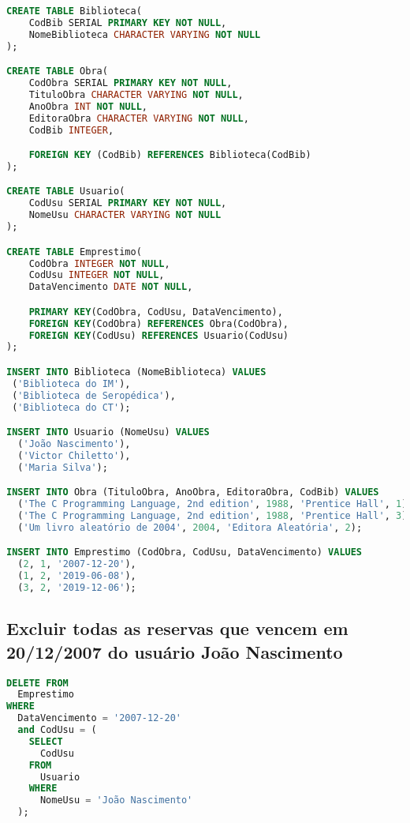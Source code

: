 \documentclass[12pt]{article}
\begin{document}
    \begin{lstlisting}[caption=Scripts em SQL para geração do banco de dados, label={lst:seedsql}, language=SQL]
CREATE TABLE Biblioteca(
    CodBib SERIAL PRIMARY KEY NOT NULL,
    NomeBiblioteca CHARACTER VARYING NOT NULL
);

CREATE TABLE Obra(
    CodObra SERIAL PRIMARY KEY NOT NULL,
    TituloObra CHARACTER VARYING NOT NULL,
    AnoObra INT NOT NULL,
    EditoraObra CHARACTER VARYING NOT NULL,
    CodBib INTEGER,

    FOREIGN KEY (CodBib) REFERENCES Biblioteca(CodBib)
);

CREATE TABLE Usuario(
    CodUsu SERIAL PRIMARY KEY NOT NULL,
    NomeUsu CHARACTER VARYING NOT NULL
);

CREATE TABLE Emprestimo(
    CodObra INTEGER NOT NULL,
    CodUsu INTEGER NOT NULL,
    DataVencimento DATE NOT NULL,

    PRIMARY KEY(CodObra, CodUsu, DataVencimento),
    FOREIGN KEY(CodObra) REFERENCES Obra(CodObra),
    FOREIGN KEY(CodUsu) REFERENCES Usuario(CodUsu)
);

INSERT INTO Biblioteca (NomeBiblioteca) VALUES
 ('Biblioteca do IM'),
 ('Biblioteca de Seropédica'),
 ('Biblioteca do CT');

INSERT INTO Usuario (NomeUsu) VALUES
  ('João Nascimento'),
  ('Victor Chiletto'),
  ('Maria Silva');

INSERT INTO Obra (TituloObra, AnoObra, EditoraObra, CodBib) VALUES 
  ('The C Programming Language, 2nd edition', 1988, 'Prentice Hall', 1),
  ('The C Programming Language, 2nd edition', 1988, 'Prentice Hall', 3),
  ('Um livro aleatório de 2004', 2004, 'Editora Aleatória', 2);

INSERT INTO Emprestimo (CodObra, CodUsu, DataVencimento) VALUES 
  (2, 1, '2007-12-20'),
  (1, 2, '2019-06-08'),
  (3, 2, '2019-12-06');
    \end{lstlisting}

  \newpage

    \subsection{Excluir todas as reservas que vencem em 20/12/2007 do usuário João Nascimento}
      \begin{lstlisting}[language=SQL]
DELETE FROM
  Emprestimo
WHERE
  DataVencimento = '2007-12-20'
  and CodUsu = (
    SELECT
      CodUsu
    FROM
      Usuario
    WHERE
      NomeUsu = 'João Nascimento'
  );
      \end{lstlisting}
\end{document}
